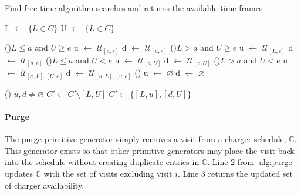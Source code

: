 \documentclass[11pt,a4paper,final]{article}
\newcommand{\C}{\mathbb{C}}                 %
\newcommand{\U}{\mathcal{U}}                %
\begin{document}
\begin{algorithm}[H]
\caption{Find free time algorithm searches and returns the available time frames} \label{alg:find-free-time}
    \LinesNumbered

    L \(\leftarrow\) \(\{L \in C\}\)\;
    U \(\leftarrow\) \(\{L \in C\}\)\;

    \Begin
    {
        \If(\tcc*[f]{If $L < a < e < U]$ (\autoref{subfig:sandwich})}){$L \leq a$ and $U \geq e$}
        {
                u $\leftarrow$ $\U_{[a,e]}$\;
                d $\leftarrow$ $\U_{[u,e]}$\;
        }
        \ElseIf(){$L > a$ and $U \geq e$}
        {
                u $\leftarrow$ $\U_{[L,e]}$\;
                d $\leftarrow$ $\U_{[u,e]}$\;
        }
        \ElseIf(){$L \leq a$ and $U < e$}
        {
                u $\leftarrow$ $\U_{[a,U]}$\;
                d $\leftarrow$ $\U_{[u,U]}$\;
        }
        \ElseIf(){$L > a$ and $U < e$}
        {
                u $\leftarrow$ $\U_{[a,L], [U,e]}$\;
                d $\leftarrow$ $\U_{[u,L], [u,e]}$\;
        }
        \Else()
        {
                u $\leftarrow$ $\varnothing$\;
                d $\leftarrow$ $\varnothing$\;
        }

        \If () {$u,d \ne \varnothing$}
        {
            $C' \leftarrow C' \setminus [L,U]$
            $C' \leftarrow \{[L,u], [d, U]\}$
        }

    }
\end{algorithm}

\paragraph{Purge}
\label{sec:purge}
The purge primitive generator simply removes a visit from a charger schedule, \(\C\). This generator exists so that other
primitive generators may place the visit back into the schedule without creating duplicate entries in \(\C\). Line 2 from
\ref{alg:purge} updates \(\C\) with the set of visits excluding visit \(i\). Line 3 returns the updated set of charger
availability.
\end{document}
